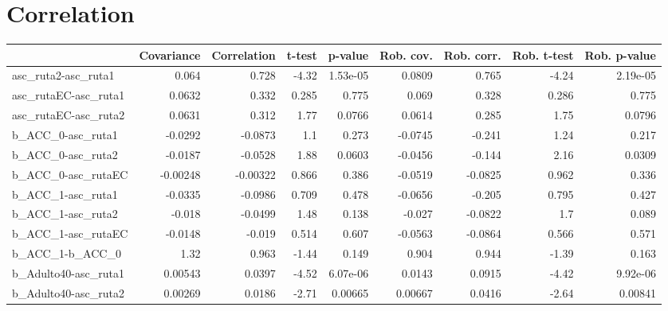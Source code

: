 \section{Correlation}
\begin{tabular}{lrrrrrrrr}
\toprule
{} &  Covariance &  Correlation &    t-test &  p-value &  Rob. cov. &  Rob. corr. &  Rob. t-test &  Rob. p-value \\
\midrule
asc\_ruta2-asc\_ruta1        &       0.064 &        0.728 &     -4.32 & 1.53e-05 &     0.0809 &       0.765 &        -4.24 &      2.19e-05 \\
asc\_rutaEC-asc\_ruta1       &      0.0632 &        0.332 &     0.285 &    0.775 &      0.069 &       0.328 &        0.286 &         0.775 \\
asc\_rutaEC-asc\_ruta2       &      0.0631 &        0.312 &      1.77 &   0.0766 &     0.0614 &       0.285 &         1.75 &        0.0796 \\
b\_ACC\_0-asc\_ruta1          &     -0.0292 &      -0.0873 &       1.1 &    0.273 &    -0.0745 &      -0.241 &         1.24 &         0.217 \\
b\_ACC\_0-asc\_ruta2          &     -0.0187 &      -0.0528 &      1.88 &   0.0603 &    -0.0456 &      -0.144 &         2.16 &        0.0309 \\
b\_ACC\_0-asc\_rutaEC         &    -0.00248 &     -0.00322 &     0.866 &    0.386 &    -0.0519 &     -0.0825 &        0.962 &         0.336 \\
b\_ACC\_1-asc\_ruta1          &     -0.0335 &      -0.0986 &     0.709 &    0.478 &    -0.0656 &      -0.205 &        0.795 &         0.427 \\
b\_ACC\_1-asc\_ruta2          &      -0.018 &      -0.0499 &      1.48 &    0.138 &     -0.027 &     -0.0822 &          1.7 &         0.089 \\
b\_ACC\_1-asc\_rutaEC         &     -0.0148 &       -0.019 &     0.514 &    0.607 &    -0.0563 &     -0.0864 &        0.566 &         0.571 \\
b\_ACC\_1-b\_ACC\_0            &        1.32 &        0.963 &     -1.44 &    0.149 &      0.904 &       0.944 &        -1.39 &         0.163 \\
b\_Adulto40-asc\_ruta1       &     0.00543 &       0.0397 &     -4.52 & 6.07e-06 &     0.0143 &      0.0915 &        -4.42 &      9.92e-06 \\
b\_Adulto40-asc\_ruta2       &     0.00269 &       0.0186 &     -2.71 &  0.00665 &    0.00667 &      0.0416 &        -2.64 &       0.00841 \\

\end{tabular}

